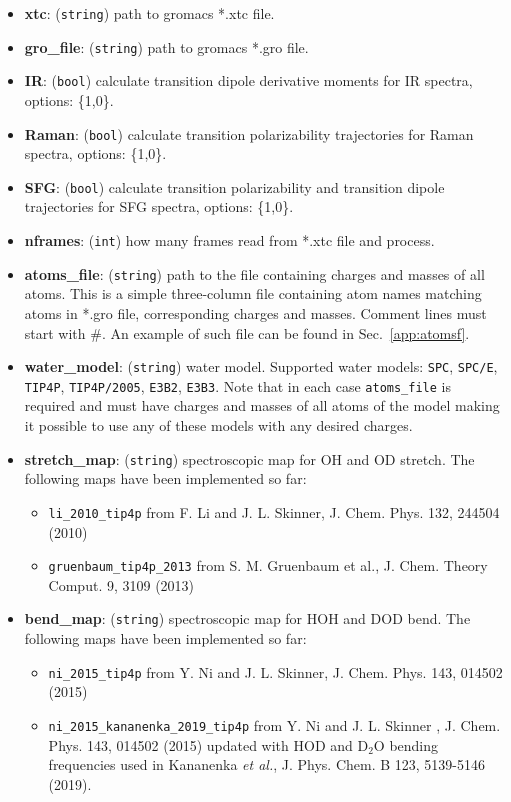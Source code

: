 \documentclass{article}
\begin{document}
\begin{itemize}

\item \textbf{xtc}: (\texttt{string}) path to gromacs *.xtc file.
\item \textbf{gro\_file}: (\texttt{string}) path to gromacs *.gro file.
\item \textbf{IR}: (\texttt{bool}) calculate transition dipole derivative moments for IR spectra, options: \{1,0\}.
\item \textbf{Raman}: (\texttt{bool}) calculate transition polarizability trajectories for Raman spectra, options: \{1,0\}.
\item \textbf{SFG}: (\texttt{bool}) calculate transition polarizability and transition dipole trajectories for SFG spectra, options: \{1,0\}.
\item \textbf{nframes}: (\texttt{int}) how many frames read from *.xtc file and process.
\item \textbf{atoms\_file}: (\texttt{string}) path to the file containing charges and masses of all atoms. This is a simple three-column file containing atom names matching atoms in 
*.gro file, corresponding charges and masses. Comment lines must start with \textsc{\#}. An example of such file can be found in Sec.~\ref{app:atomsf}.
\item \textbf{water\_model}: (\texttt{string}) water model. Supported water models: \texttt{SPC}, \texttt{SPC/E}, \texttt{TIP4P}, \texttt{TIP4P/2005}, \texttt{E3B2}, \texttt{E3B3}.
Note that in each case \texttt{atoms\_file} is required and must have charges and masses of all atoms of the model making it possible to use any of these models
with any desired charges.
\item \textbf{stretch\_map}: (\texttt{string}) spectroscopic map for OH and OD stretch. The following maps have been implemented so far:
\begin{itemize}
\item \texttt{li\_2010\_tip4p} from F. Li and J. L. Skinner, J. Chem. Phys. 132, 244504 (2010) 
\item  \texttt{gruenbaum\_tip4p\_2013} from S. M. Gruenbaum et al., J. Chem. Theory Comput. 9, 3109 (2013)
\end{itemize}

\item \textbf{bend\_map}: (\texttt{string}) spectroscopic map for HOH and DOD bend. 
The following maps have been implemented so far:
\begin{itemize}
\item \texttt{ni\_2015\_tip4p} from Y. Ni and J. L. Skinner, J. Chem. Phys. 143, 014502 (2015)
\item  \texttt{ni\_2015\_kananenka\_2019\_tip4p} from Y. Ni and J. L. Skinner , J. Chem. Phys. 143, 014502 (2015) updated with HOD and D$_2$O 
bending frequencies used in Kananenka \textit{et al.}, J. Phys. Chem. B 123, 5139-5146 (2019).
\end{itemize}



\end{itemize}
\end{document}

